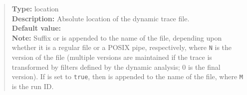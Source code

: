 \begin{quote}
{\bf Type:} location  \\
{\bf Description:} Absolute location of the dynamic trace file.  \\
{\bf Default value:}  \\
{\bf Note:} Suffix  or  is appended to the name of the file, depending upon whether it is a regular file or a POSIX pipe, respectively, where {\tt N} is the version of the file (multiple versions are maintained if the trace is transformed by filters defined by the dynamic analysis; 0 is the final version).  If  is set to {\tt true}, then  is appended to the name of the file, where {\tt M} is the run ID. 
\end{quote}



